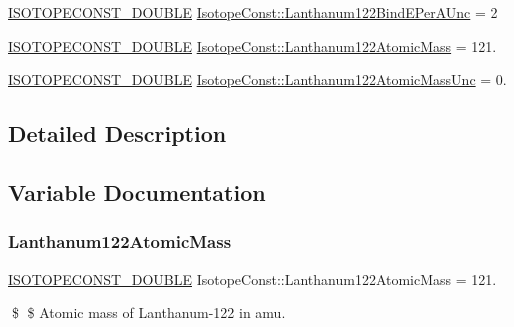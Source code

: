 \begin{DoxyCompactItemize}
\mbox{\hyperlink{group___isotope_const-_macros_ga8f45a7272ce02c0b4c65c44636ed719a}{I\+S\+O\+T\+O\+P\+E\+C\+O\+N\+S\+T\+\_\+\+D\+O\+U\+B\+LE}} \mbox{\hyperlink{group___isotope_const-_lanthanum-_la122_ga052e8fd7864ecb79ef3f0ad55977fc5a}{Isotope\+Const\+::\+Lanthanum122\+Bind\+E\+Per\+A\+Unc}} = 2
\item 
\mbox{\hyperlink{group___isotope_const-_macros_ga8f45a7272ce02c0b4c65c44636ed719a}{I\+S\+O\+T\+O\+P\+E\+C\+O\+N\+S\+T\+\_\+\+D\+O\+U\+B\+LE}} \mbox{\hyperlink{group___isotope_const-_lanthanum-_la122_ga78200f825f50f7742f65837b4cc9910e}{Isotope\+Const\+::\+Lanthanum122\+Atomic\+Mass}} = 121.
\item 
\mbox{\hyperlink{group___isotope_const-_macros_ga8f45a7272ce02c0b4c65c44636ed719a}{I\+S\+O\+T\+O\+P\+E\+C\+O\+N\+S\+T\+\_\+\+D\+O\+U\+B\+LE}} \mbox{\hyperlink{group___isotope_const-_lanthanum-_la122_ga8e80225ffc8fc3e0b504dd86f14743e3}{Isotope\+Const\+::\+Lanthanum122\+Atomic\+Mass\+Unc}} = 0.
\end{DoxyCompactItemize}


\subsection{Detailed Description}


\subsection{Variable Documentation}
\mbox{\label{group___isotope_const-_lanthanum-_la122_ga78200f825f50f7742f65837b4cc9910e}} 
\subsubsection{\texorpdfstring{Lanthanum122\+Atomic\+Mass}{Lanthanum122AtomicMass}}
{\footnotesize\ttfamily \mbox{\hyperlink{group___isotope_const-_macros_ga8f45a7272ce02c0b4c65c44636ed719a}{I\+S\+O\+T\+O\+P\+E\+C\+O\+N\+S\+T\+\_\+\+D\+O\+U\+B\+LE}} Isotope\+Const\+::\+Lanthanum122\+Atomic\+Mass = 121.}

\$ \$ Atomic mass of Lanthanum-\/122 in amu. \mbox{\label{group___isotope_const-_lanthanum-_la122_ga8e80225ffc8fc3e0b504dd86f14743e3}} 
